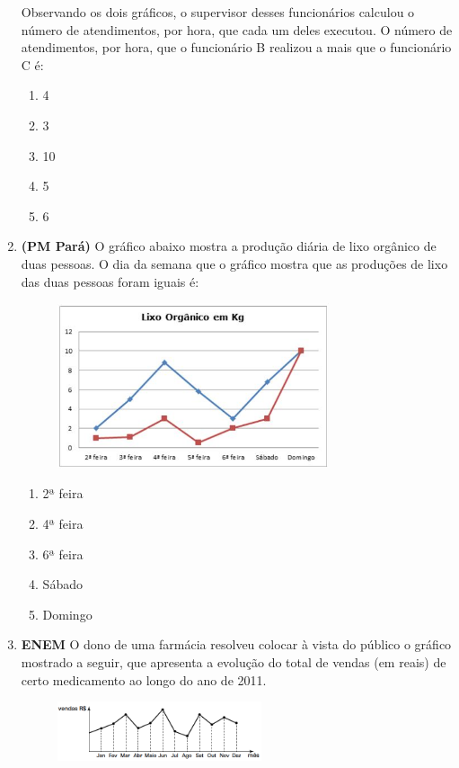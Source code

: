 \documentclass[twocolumn,oneside,a4paper,10pt]{article}
\begin{document}
\begin{enumerate}
Observando os dois gráficos, o supervisor desses funcionários calculou o número de atendimentos, por hora, que cada um deles executou. O número de atendimentos, por hora, que o funcionário B realizou a mais que o funcionário C é:
\begin{enumerate}
\item 4
\item 3
\item 10
\item 5
\item 6
\end{enumerate}

\item \textbf{(PM Pará)} O gráfico abaixo mostra a produção diária de lixo orgânico de duas pessoas. O dia da semana que o gráfico mostra que as produções de lixo das duas pessoas foram iguais é:

\begin{figure}[!htb]
\center
\includegraphics[width=8cm]{Figuras/g10.jpg}
\end{figure}

\begin{enumerate}
\item 2ª feira
\item 4ª feira
\item 6ª feira
\item Sábado
\item Domingo
\end{enumerate}

\item \textbf{ENEM} O dono de uma farmácia resolveu colocar à vista do público o gráfico mostrado a seguir, que apresenta a evolução do total de vendas (em reais) de certo medicamento ao longo do ano de 2011.

\begin{figure}[!htb]
\center
\includegraphics[width=6cm]{Figuras/g11.png}
\end{figure}


\end{enumerate}
\end{document}
